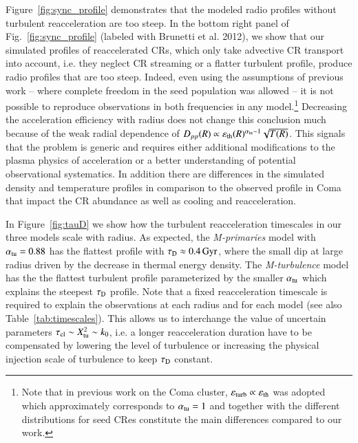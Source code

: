 \documentclass[fleqn,usenatbib,useAMS]{mnras}
\newcommand{\Mflatturb}{{\it M-turbulence}\xspace}
\newcommand{\Mprimary}{{\it M-primaries}\xspace}
\newcommand{\eps}{\varepsilon}
\begin{document}
Figure~\ref{fig:sync_profile} demonstrates that the modeled radio
profiles without turbulent reacceleration are too steep.  In the
bottom right panel of Fig.~\ref{fig:sync_profile} (labeled with
Brunetti et al. 2012), we show that our simulated profiles of
reaccelerated CRs, which only take advective CR transport into
account, i.e. they neglect CR streaming or a flatter turbulent
profile, produce radio profiles that are too steep. Indeed, even using
the assumptions of previous work -- where complete freedom in the seed
population was allowed -- it is not possible to reproduce observations
in both frequencies in any model.\footnote{Note that in previous work
  on the Coma cluster, $\eps_\rmn{turb} \propto \eps_\rmn{th}$ was
  adopted which approximately corresponds to $\alpha_{\mathrm{tu}}= 1$
  \citep{brunetti12} and together with the different distributions for
  seed CRes constitute the main differences compared to our work.}
Decreasing the acceleration efficiency with radius does not change
this conclusion much because of the weak radial dependence of
$D_{pp}(R)\propto \eps_\rmn{th}(R)^{\alpha_\rmn{tu}-1}
\sqrt{T(R)}$. This signals that the problem is generic and requires
either additional modifications to the plasma physics of acceleration
or a better understanding of potential observational systematics. In
addition there are differences in the simulated density and
temperature profiles in comparison to the observed profile in Coma
that impact the CR abundance as well as cooling and reacceleration.

In Figure~\ref{fig:tauD} we show how the turbulent reacceleration
timescales in our three models scale with radius. As expected, the
\Mprimary model with $\alpha_{\mathrm{tu}}=0.88$ has the flattest profile
with $\tau_{\rm D}\approx0.4\,{\mathrm{Gyr}}$, where the small dip at large
radius driven by the decrease in thermal energy density. The
\Mflatturb model has the the flattest turbulent profile parameterized
by the smaller $\alpha_{\mathrm{tu}}$ which explains the steepest $\tau_{\rm D}$
profile. Note that a fixed reacceleration timescale is required to
explain the observations at each radius and for each model (see also
Table~\ref{tab:timescales}). This allows us to interchange the value
of uncertain parameters $\tau_{\mathrm{cl}} \sim X_{\mathrm{tu}}^2 \sim k_0$,
i.e. a longer reacceleration duration have to be compensated by
lowering the level of turbulence or increasing the physical injection
scale of turbulence to keep $\tau_{\rm D}$ constant.
\end{document}
